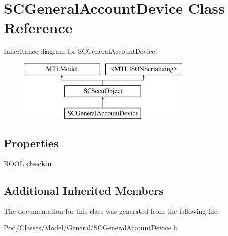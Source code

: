 \hypertarget{interface_s_c_general_account_device}{}\section{S\+C\+General\+Account\+Device Class Reference}
\label{interface_s_c_general_account_device}
Inheritance diagram for S\+C\+General\+Account\+Device\+:\begin{figure}[H]
\begin{center}
\leavevmode
\includegraphics[height=3.000000cm]{interface_s_c_general_account_device}
\end{center}
\end{figure}
\subsection*{Properties}
\begin{DoxyCompactItemize}
\item 
B\+O\+OL {\bfseries checkin}\hypertarget{interface_s_c_general_account_device_a8a1ace7f9481b08ef57e8c060bbb9347}{}\label{interface_s_c_general_account_device_a8a1ace7f9481b08ef57e8c060bbb9347}

\end{DoxyCompactItemize}
\subsection*{Additional Inherited Members}


The documentation for this class was generated from the following file\+:\begin{DoxyCompactItemize}
\item 
Pod/\+Classes/\+Model/\+General/S\+C\+General\+Account\+Device.\+h\end{DoxyCompactItemize}

